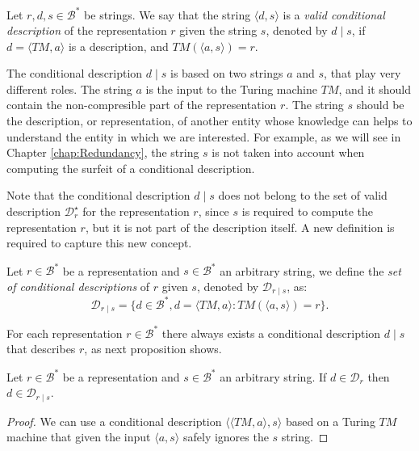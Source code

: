 \begin{definition}
Let $r, d, s \in \mathcal{B}^\ast$ be strings. We say that the string $\langle d, s \rangle$ is a \emph{valid conditional description} of the representation $r$ given the string $s$, denoted by $d \mid s$, if $d = \langle TM, a \rangle$ is a description, and $TM \left(\langle a, s \rangle \right) = r$.
\end{definition}

The conditional description $d \mid s$ is based on two strings $a$ and $s$, that play very different roles. The string $a$ is the input to the Turing machine $TM$,  and it should contain the non-compresible part of the representation $r$. The string $s$ should be the description, or representation, of another entity whose knowledge can helps to understand the entity in which we are interested. For example, as we will see in Chapter \ref{chap:Redundancy}, the string $s$ is not taken into account when computing the surfeit of a conditional description.

Note that the conditional description $d \mid s$ does not belong to the set of valid description $\mathcal{D}^\star_r$ for the representation $r$, since $s$ is required to compute the representation $r$, but it is not part of the description itself. A new definition is required to capture this new concept.

\begin{definition}
Let $r \in \mathcal{B}^\ast$ be a representation and $s \in \mathcal{B}^\ast$ an arbitrary string, we define the \emph{set of conditional descriptions} of $r$ given $s$, denoted by $\mathcal{D}_{r \mid s}$, as:
\[
\mathcal{D}_{r \mid s} = \{ d \in \mathcal{B}^\ast, d = \langle TM, a \rangle : TM \left(\langle a, s \rangle \right) = r \}.
\]
\end{definition}

For each representation $r \in \mathcal{B}^\ast$ there always exists a conditional description $d \mid s$ that describes $r$, as next proposition shows.

\begin{proposition}
\label{prop:description_implies_conditional}
Let $r \in \mathcal{B}^\ast$ be a representation and $s \in \mathcal{B}^\ast$ an arbitrary string. If $d \in \mathcal{D}_{r}$ then $d \in \mathcal{D}_{r \mid s}$.
\end{proposition}
\begin{proof}
We can use a conditional description $\langle \langle TM, a \rangle, s \rangle$ based on a Turing $TM$ machine that given the input $\langle a, s \rangle$ safely ignores the $s$ string.
\end{proof}

